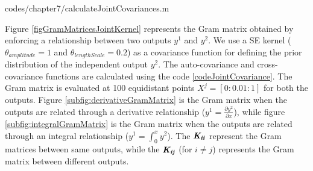 \begin{mdframed}[hidealllines=true,backgroundcolor=lightgray!20]
            {codes/chapter7/calculateJointCovariances.m}
\end{mdframed}

Figure \ref{figGramMatricesJointKernel} represents the Gram matrix obtained by enforcing a relationship between two outputs $y^1$ and $y^2$. We use a SE kernel ($\theta_{amplitude} = 1$ and $\theta_{lengthScale} = 0.2$) as a covariance function for defining the prior distribution of the independent output $y^2$. The auto-covariance and cross-covariance functions are calculated using the code \ref{codeJointCovariance}. The Gram matrix is evaluated at 100 equidistant points $X^j = [0:0.01:1]$ for both the outputs. Figure \ref{subfig:derivativeGramMatrix} is the Gram matrix when the outputs are related through a derivative relationship (\(y^1 = \frac{\partial y^2}{\partial x}\)), while figure \ref{subfig:integralGramMatrix} is the Gram matrix when the outputs are related through an integral relationship (\(y^1 = \int_{0}^{x} y^2\)). The $\bm{\mathit{K_{ii}}}$ represent the Gram matrices between same outputs, while the $\bm{\mathit{K_{ij}}}$ (for $i \neq j$) represents the Gram matrix between different outputs.

